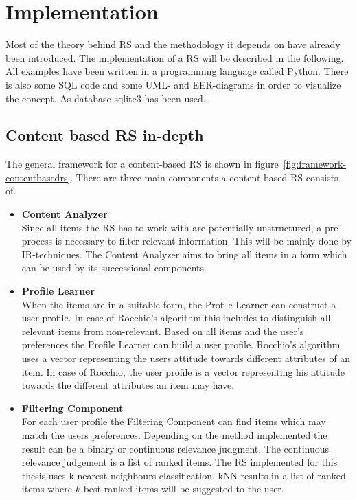 

\section{Implementation}
Most of the theory behind RS and the methodology it depends on have already been introduced.
The implementation of a RS will be described in the following.
All examples have been written in a programming language called Python.
There is also some SQL code and some UML- and EER-diagrams in order to visualize the concept.
As database \gls{sqlite3} has been used.

\subsection{Content based RS in-depth}
\label{sec:implementation-contentbased}
The general framework for a content-based RS is shown in figure~\ref{fig:framework-contentbasedrs}.
There are three main components a content-based RS consists of.
\begin{itemize}
    \item \textbf{Content Analyzer}\hfill\\
        Since all items the RS has to work with are potentially unstructured, a pre-process is necessary to filter relevant information.
        This will be mainly done by IR-techniques.
        The Content Analyzer aims to bring all items in a form which can be used by its successional components.
        \citep[p.~75-77]{lops:2011}
    \item \textbf{Profile Learner}\hfill\\
        When the items are in a suitable form, the Profile Learner can construct a user profile.
        In case of Rocchio's algorithm this includes to distinguish all relevant items from non-relevant.
        Based on all items and the user's preferences the Profile Learner can build a user profile.
        Rocchio's algorithm uses a vector representing the users attitude towards different attributes of an item.
        In case of Rocchio, the user profile is a vector representing his attitude towards the different attributes an item may have.
        \citep[p.~75-77]{lops:2011}
    \item \textbf{Filtering Component}\hfill\\
        For each user profile the Filtering Component can find items which may match the users preferences.
        Depending on the method implemented the result can be a binary or continuous relevance judgment.
        The continuous relevance judgement is a list of ranked items.
        \citep[p.~75-77]{lops:2011}
        The RS implemented for this thesis uses k-nearest-neighbours classification.
        kNN results in a list of ranked items where $k$ best-ranked items will be suggested to the user.
\end{itemize}



